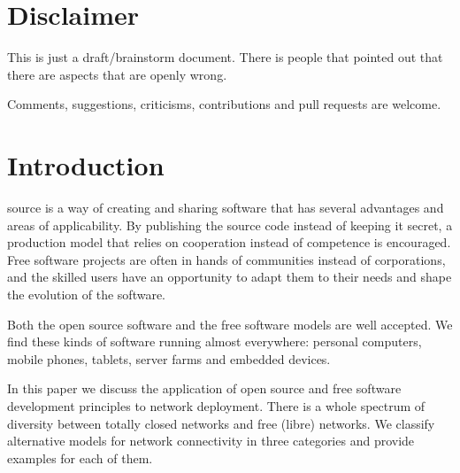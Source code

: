 \documentclass[journal]{IEEEtran}
\begin{document}
%
\IEEEpeerreviewmaketitle

\section{Disclaimer}

This is just a draft/brainstorm document.
There is people that pointed out that there are aspects that are openly wrong.

Comments, suggestions, criticisms, contributions and pull requests are welcome.

\section{Introduction}
%
%
%
%
 source is a way of creating and sharing software that has several advantages and areas of applicability.
By publishing the source code instead of keeping it secret, a production model that relies on cooperation instead of competence is encouraged.
Free software projects are often in hands of communities instead of corporations, and the skilled users have an opportunity to adapt them to their needs and shape the evolution of the software.

Both the open source software and the free software models are well accepted.
We find these kinds of software running almost everywhere: personal computers, mobile phones, tablets, server farms and embedded devices.

In this paper we discuss the application of open source and free software development principles to network deployment.
There is a whole spectrum of diversity between totally closed networks and free (libre) networks.
We classify alternative models for network connectivity in three categories and provide examples for each of them.
\end{document}
